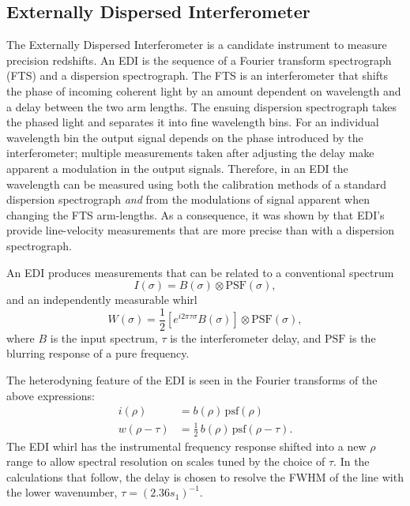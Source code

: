 \documentclass[preprint2, 10pt]{aastex}
\begin{document}
\subsection{Externally Dispersed Interferometer} 

The Externally Dispersed Interferometer \citep[EDI;][]{2003PASP..115..255E} is a candidate instrument to measure precision redshifts. 
An EDI is the sequence of a Fourier transform spectrograph (FTS) and a dispersion spectrograph.  The FTS is an interferometer that shifts
the phase of incoming coherent light
by an amount dependent on wavelength and a  delay between the two arm lengths.
The ensuing dispersion spectrograph takes the phased light and separates it into fine wavelength bins.
For an individual wavelength bin the output signal depends on the phase introduced by the interferometer; multiple
measurements taken after adjusting the delay  make apparent a modulation in the output signals.
Therefore, in an EDI the wavelength can be measured using both the calibration methods of a standard dispersion
spectrograph {\it and\/} from the modulations of signal apparent when changing the FTS arm-lengths.   As a consequence,
it was shown by
\citet{2003PASP..115..255E} that EDI's provide line-velocity measurements that are more precise than with a dispersion spectrograph.

An EDI produces measurements that can be related
to a conventional spectrum
\begin{equation}
I(\sigma) = B(\sigma) \otimes \mbox{PSF}(\sigma),
\end{equation}
and an independently measurable whirl
\begin{equation}
W(\sigma) = \frac{1}{2}\left[e^{i2\pi\tau\sigma}B(\sigma)\right] \otimes \mbox{PSF}(\sigma),
\end{equation}
where $B$ is the input spectrum, $\tau$ is the interferometer delay, and $\mbox{PSF}$  is the blurring
response of a pure frequency.

The heterodyning feature of the EDI is seen in the Fourier transforms of the above expressions:
\begin{align}
i(\rho) & =b(\rho) \, \mbox{psf}(\rho)\\
w(\rho -\tau) & =\frac{1}{2}\, b(\rho) \, \mbox{psf}(\rho-\tau).
\end{align}
The EDI whirl has the instrumental frequency response shifted into a new $\rho$ range to allow
spectral
resolution on scales tuned by the choice of $\tau$.  In the calculations that follow, the delay is chosen to resolve
the FWHM of the line with the lower wavenumber, $\tau = (2.36s_1)^{-1}$.
\end{document}
